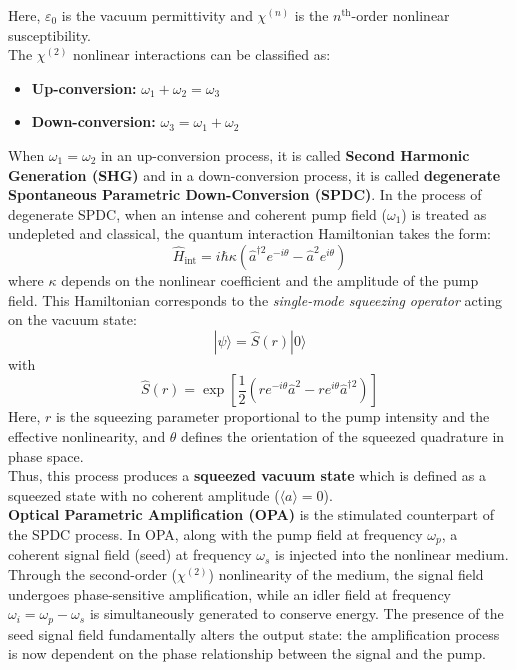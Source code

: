 \documentclass[colorlinks=true,pdfstartview=FitV,linkcolor=blue,
citecolor=red,urlcolor=magenta]{ligodoc}
\begin{document}
Here, $\varepsilon_0$ is the vacuum permittivity and $\chi^{(n)}$ is the $n^{\text{th}}$-order nonlinear susceptibility.\\

The $\chi^{(2)}$ nonlinear interactions can be classified as:
\begin{itemize}
    \item \textbf{Up-conversion:} $\omega_1 + \omega_2 = \omega_3$
    \item \textbf{Down-conversion:} $\omega_3 = \omega_1 + \omega_2$
\end{itemize}
When $\omega_1= \omega_2$ in an up-conversion process, it is called \textbf{Second Harmonic Generation (SHG)} and in a down-conversion process, it is called\textbf{ degenerate} \textbf{Spontaneous Parametric Down-Conversion (SPDC)}. In the process of degenerate SPDC, when an intense and coherent pump field ($\omega_1$) is treated as undepleted and classical, the quantum interaction Hamiltonian takes the form:
\begin{equation}
\hat{H}_\text{int} = i \hbar \kappa \left( \hat{a}^{\dagger 2} e^{-i\theta} - \hat{a}^2 e^{i\theta} \right)
\end{equation}
where $\kappa$ depends on the nonlinear coefficient and the amplitude of the pump field. This Hamiltonian corresponds to the \textit{single-mode squeezing operator} acting on the vacuum state:
\begin{equation}
|\psi\rangle = \hat{S}(r) |0\rangle
\end{equation}
with
\begin{equation}
\hat{S}(r) = \exp\left[ \frac{1}{2} \left( r e^{-i\theta} \hat{a}^2 - r e^{i\theta} \hat{a}^{\dagger 2} \right) \right]
\end{equation}
Here, $r$ is the squeezing parameter proportional to the pump intensity and the effective nonlinearity, and $\theta$ defines the orientation of the squeezed quadrature in phase space.\\ 

Thus, this process produces a \textbf{squeezed vacuum state} which is defined as a squeezed state with no coherent amplitude ($\langle a \rangle = 0$). \\
 
 \textbf{Optical Parametric Amplification (OPA)} is the stimulated counterpart of the SPDC process. In OPA, along with the pump field at frequency $\omega_p$, a coherent signal field (seed) at frequency $\omega_s$ is injected into the nonlinear medium. Through the second-order ($\chi^{(2)}$) nonlinearity of the medium, the signal field undergoes phase-sensitive amplification, while an idler field at frequency $\omega_i = \omega_p - \omega_s$ is simultaneously generated to conserve energy. The presence of the seed signal field fundamentally alters the output state: the amplification process is now dependent on the phase relationship between the signal and the pump.
\end{document}
